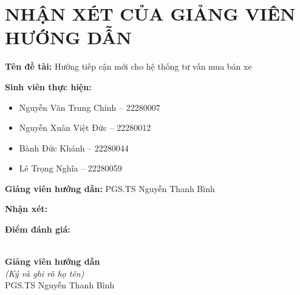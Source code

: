 \clearpage
\chapter*{\centering NHẬN XÉT CỦA GIẢNG VIÊN HƯỚNG DẪN}

\vspace{0.5cm}

\noindent\textbf{Tên đề tài:} Hướng tiếp cận mới cho hệ thống tư vấn mua bán xe

\noindent\textbf{Sinh viên thực hiện:}
\begin{itemize}[noitemsep]
  \item Nguyễn Văn Trung Chính -- 22280007
  \item Nguyễn Xuân Việt Đức -- 22280012
  \item Bành Đức Khánh -- 22280044
  \item Lê Trọng Nghĩa -- 22280059
\end{itemize}

\noindent\textbf{Giảng viên hướng dẫn:} PGS.TS Nguyễn Thanh Bình

\vspace{0.5cm}

\noindent\textbf{Nhận xét:}

\vspace{0.3cm}
\noindent\dotfill

\noindent\dotfill

\noindent\dotfill

\noindent\dotfill

\noindent\dotfill

\noindent\dotfill

\noindent\dotfill

\noindent\dotfill

\noindent\dotfill

\noindent\dotfill

\noindent\dotfill

\noindent\dotfill

\noindent\dotfill

\noindent\dotfill

\noindent\dotfill

\vspace{0.5cm}
\noindent\textbf{Điểm đánh giá:} \dotfill

\vspace{1.5cm}

\begin{flushright}
\\[0.3cm]
\textbf{Giảng viên hướng dẫn}\\[0.3cm]
\textit{(Ký và ghi rõ họ tên)}\\[3cm]
PGS.TS Nguyễn Thanh Bình
\end{flushright}
